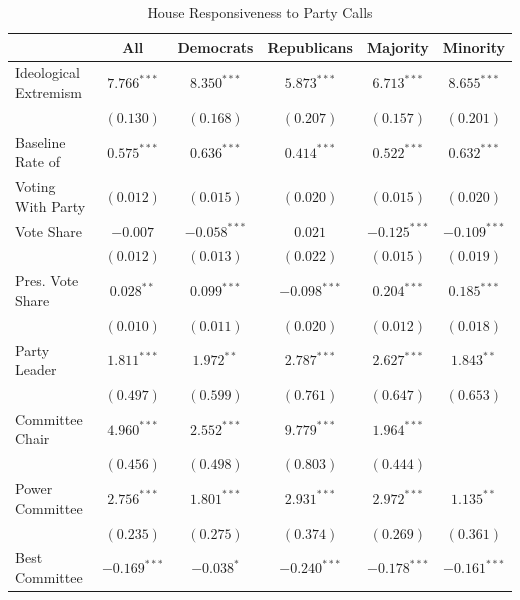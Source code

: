 \documentclass[12pt]{article}
\begin{document}
\begin{table}[H]
\centering
\begin{threeparttable}
\label{tab-house-models}
\singlespacing
\small
\caption{House Responsiveness to Party Calls}
\begin{tabular}{l c c c c c }
\hline
& All & Democrats & Republicans & Majority & Minority \\
\hline
Ideological Extremism & $7.766^{***}$  & $8.350^{***}$  & $5.873^{***}$  & $6.713^{***}$  & $8.655^{***}$  \\
& $(0.130)$      & $(0.168)$      & $(0.207)$      & $(0.157)$      & $(0.201)$      \\
Baseline Rate of               & $0.575^{***}$  & $0.636^{***}$  & $0.414^{***}$  & $0.522^{***}$  & $0.632^{***}$  \\
\hspace{.7em}Voting With Party& $(0.012)$      & $(0.015)$      & $(0.020)$      & $(0.015)$      & $(0.020)$      \\
Vote Share            & $-0.007$       & $-0.058^{***}$ & $0.021$        & $-0.125^{***}$ & $-0.109^{***}$ \\
& $(0.012)$      & $(0.013)$      & $(0.022)$      & $(0.015)$      & $(0.019)$      \\
Pres. Vote Share      & $0.028^{**}$   & $0.099^{***}$  & $-0.098^{***}$ & $0.204^{***}$  & $0.185^{***}$  \\
& $(0.010)$      & $(0.011)$      & $(0.020)$      & $(0.012)$      & $(0.018)$      \\
Party Leader                 & $1.811^{***}$  & $1.972^{**}$   & $2.787^{***}$  & $2.627^{***}$  & $1.843^{**}$   \\
& $(0.497)$      & $(0.599)$      & $(0.761)$      & $(0.647)$      & $(0.653)$      \\
Committee Chair                  & $4.960^{***}$  & $2.552^{***}$  & $9.779^{***}$  & $1.964^{***}$  &                \\
& $(0.456)$      & $(0.498)$      & $(0.803)$      & $(0.444)$      &                \\
Power Committee                  & $2.756^{***}$  & $1.801^{***}$  & $2.931^{***}$  & $2.972^{***}$  & $1.135^{**}$   \\
& $(0.235)$      & $(0.275)$      & $(0.374)$      & $(0.269)$      & $(0.361)$      \\
Best Committee          & $-0.169^{***}$ & $-0.038^{*}$   & $-0.240^{***}$ & $-0.178^{***}$ & $-0.161^{***}$ \\

\end{tabular}
\end{threeparttable}
\end{table}
\end{document}
